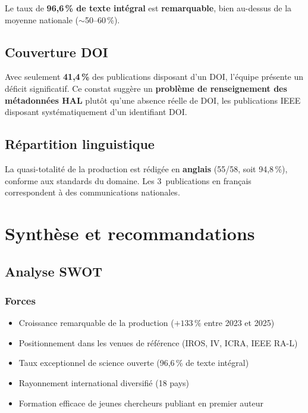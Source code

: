 \documentclass[a4paper,11pt]{article}
\begin{document}
Le taux de \textbf{96,6\,\% de texte intégral} est \textbf{remarquable}, bien au-dessus de la moyenne nationale ($\sim$50--60\,\%).

\subsection{Couverture DOI}

Avec seulement \textbf{41,4\,\%} des publications disposant d'un DOI, l'équipe présente un déficit significatif. Ce constat suggère un \textbf{problème de renseignement des métadonnées HAL} plutôt qu'une absence réelle de DOI, les publications IEEE disposant systématiquement d'un identifiant DOI.

\subsection{Répartition linguistique}

La quasi-totalité de la production est rédigée en \textbf{anglais} (55/58, soit 94,8\,\%), conforme aux standards du domaine. Les 3~publications en français correspondent à des communications nationales.

\section{Synthèse et recommandations}

\subsection{Analyse SWOT}

\subsubsection{Forces}
\begin{itemize}[nosep]
  \item Croissance remarquable de la production ($+133\,\%$ entre 2023 et 2025)
  \item Positionnement dans les venues de référence (IROS, IV, ICRA, IEEE RA-L)
  \item Taux exceptionnel de science ouverte (96,6\,\% de texte intégral)
  \item Rayonnement international diversifié (18 pays)
  \item Formation efficace de jeunes chercheurs publiant en premier auteur
\end{itemize}
\end{document}
